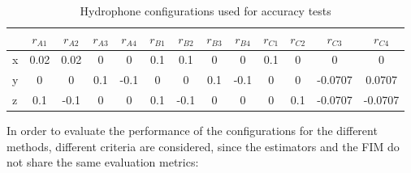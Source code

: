 \begin{table}[!htbp] %
	\begin{center}
		\begin{tabular}{ l | c c c c | c c c c | c c c c}
			\toprule
			\multicolumn{1}{c|}{} & $r_{A1}$ & $r_{A2}$ & $r_{A3}$ & $r_{A4}$ & $r_{B1}$ & $r_{B2}$ & $r_{B3}$ & $r_{B4}$ & $r_{C1}$ & $r_{C2}$ & $r_{C3}$ & $r_{C4}$ \\
			\midrule
			\multirow{1}{0.5em}{x} 
			& 0.02 & 0.02 & 0 & 0 & 0.1 & 0.1 & 0 & 0 & 0.1 & 0 & 0 & 0  \\
			\multirow{1}{0.5em}{y} 
			& 0 & 0 & 0.1 & -0.1 & 0 & 0 & 0.1 & -0.1 & 0 & 0 & -0.0707 & 0.0707 \\
			\multirow{1}{0.5em}{z} 
			& 0.1 & -0.1  & 0 & 0 & 0.1 & -0.1  & 0 & 0 & 0 & 0.1 & -0.0707  & -0.0707\\
			\bottomrule 
		\end{tabular}
		\caption{Hydrophone configurations used for accuracy tests}
		\label{tab:configs_test1}
	\end{center}
\end{table}

In order to evaluate the performance of the configurations for the different methods, different criteria are considered, since the estimators and the FIM do not share the same evaluation metrics:

